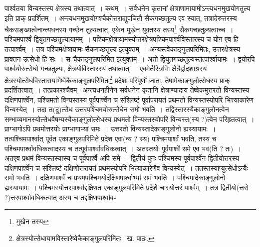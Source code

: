 \documentclass[11pt, openany]{book}
\begin{document}
\noindent पार्श्वतया विन्यस्तस्य क्षेत्रस्य तथात्वात्~। कथम्~। सर्वधनेन कृतानां क्षेत्राणामायामोऽन्त्यधनमुखयोगतुल्य इति प्राक् प्रदर्शितम्~।
अन्त्यधनमुखयोगश्चैकोत्तराद्युपचितौ सैकगच्छतुल्य एव स्यात्, तत्रादेरुत्तरस्य चैकसङ्ख्यत्वेनान्त्यधनस्य गच्छेन तुल्यत्वात्, एकेन मुखेन युक्तस्य तस्य\renewcommand{\thefootnote}{१}\footnote{मुखेन तस्य} सैकगच्छतुल्यत्वाच्च~। पश्चिमपार्श्वं द्वियुतगच्छतुल्यायामम्~। पश्चिमक्षेत्रायामस्योत्तरक्षेत्रपश्चिमपार्श्वविस्तारस्य च योग एव हि तत्पार्श्वम्~। तत्र पश्चिमक्षेत्रायामः सैकगच्छतुल्य इत्युक्तम्~। अन्यस्त्वेकाङ्गुलपरिमितः, उत्तरक्षेत्रस्य प्राक्तन उत्सेधो हि सः~। स चैकाङ्गुलपरिमित इत्युक्तम्~। अतो द्वियुतगच्छतुल्यस्तत्पार्श्वायामः~। द्वयोरपि पार्श्वयोरुत्सेधो गच्छतुल्यः, क्षेत्रयोर्विस्तारस्य तथात्वात्~। एवमेतैस्त्रिभिः क्षेत्रैर्द्वादशाश्रस्य क्षेत्रस्योत्सेधविस्तारायाभेष्वेकैकाङ्गुलपरिमितः\renewcommand{\thefootnote}{२}\footnote{क्षेत्रस्योत्सेधायामविस्तारेष्वेकैकाङ्गुलपरिमितः \textendash\ ख. पाठः.} प्रदेशः परिपूर्णो जातः, तेषामेकाङ्गुलोत्सेधस्य प्राक् प्रदर्शितत्वात्~। तत्प्रकारश्चैवम् \textendash\ अन्त्यधनहीनेन सर्वधनेन कृतानि क्षेत्राण्यादाय तेष्वेकमुत्तरतो विन्यस्तस्य दक्षिणपार्श्वेन, पश्चिमतो विन्यस्तस्य पूर्वपार्श्वेन च संश्लिष्टं पूर्वापरायतं प्रथमतो विन्यस्तस्योपरि भित्त्याकारेण विन्यस्येत्~। तदा त(दु)त्सेध उत्तरपश्चिमयोरुत्सेधेन समो भवति~। तद्विस्तारस्यैकाङ्गुलोनत्वेन
सम्भाव्यमानस्योत्सेधवैषम्यस्यैकाङ्गुलोत्सेधस्य प्रथमतो विन्यस्तस्योपरि विन्यस्त(स्य ?)त्वेन परिहृतत्वात्~। प्राग्भागोऽपि प्रथमोत्तरयोः प्राग्भागाभ्यां समः~। उत्तरतो विन्यस्तादेकाङ्गुलोनो ह्यस्यायामः~। तत्पश्चिमपार्श्वात् पूर्वत एकाङ्गुलपरिमिते प्रदेश एवा(न्य ? स्य) पश्चिमपार्श्वं भवति, तस्य च पश्चिमपार्श्वावधिकत्वादस्य च तत्पूर्वपार्श्वावधिकत्वात्~। अतस्तयोः पूर्वपार्श्वे समे एव भव(ति ? तः)~। अतएव प्रथमं विन्यस्तस्यास्य च पूर्वपार्श्वे अपि समे~। द्वितीयं पुनः पश्चिमस्य पूर्वपार्श्वेन द्वितीयोत्तरस्य दक्षिणपार्श्वेन च संश्लिष्टं दक्षिणोत्तरायतं प्रथमस्योपरि भित्याकारेणैव विन्यस्येत्~। ततस्तस्याप्युत्सेधोऽन्यैः समो भवति~। दक्षिणपार्श्वं च प्रथमपश्चिमयोर्दक्षिणपार्श्वाभ्यां समं भवति~। पश्चिमादेकाङ्गुलोनो ह्यस्यायामः~। पश्चिमस्योत्तरपार्श्वाद्दक्षिणत एकाङ्गुलपरिमिते प्रदेशे चास्योत्तरं पार्श्वम्~। तत्र द्वितीयो(त्तरो ?)त्तरपार्श्वावधिकत्वात् अस्य च तद्दक्षिणपार्श्वाव-
\end{document}
